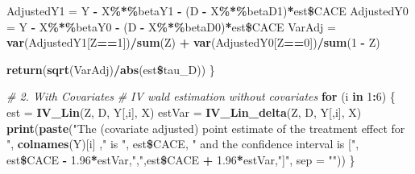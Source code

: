 \documentclass[]{article}
\newenvironment{Shaded}{\begin{snugshade}}{\end{snugshade}}
\newcommand{\KeywordTok}[1]{\textcolor[rgb]{0.13,0.29,0.53}{\textbf{#1}}}
\newcommand{\DataTypeTok}[1]{\textcolor[rgb]{0.13,0.29,0.53}{#1}}
\newcommand{\DecValTok}[1]{\textcolor[rgb]{0.00,0.00,0.81}{#1}}
\newcommand{\FloatTok}[1]{\textcolor[rgb]{0.00,0.00,0.81}{#1}}
\newcommand{\StringTok}[1]{\textcolor[rgb]{0.31,0.60,0.02}{#1}}
\newcommand{\CommentTok}[1]{\textcolor[rgb]{0.56,0.35,0.01}{\textit{#1}}}
\newcommand{\ControlFlowTok}[1]{\textcolor[rgb]{0.13,0.29,0.53}{\textbf{#1}}}
\newcommand{\OperatorTok}[1]{\textcolor[rgb]{0.81,0.36,0.00}{\textbf{#1}}}
\newcommand{\NormalTok}[1]{#1}
\begin{document}
\begin{Shaded}
\begin{Highlighting}[]
\NormalTok{  AdjustedY1   =}\StringTok{ }\NormalTok{Y }\OperatorTok{-}\StringTok{ }\NormalTok{X}\OperatorTok{\%*\%}\NormalTok{betaY1 }\OperatorTok{-}\StringTok{ }
\StringTok{                     }\NormalTok{(D }\OperatorTok{-}\StringTok{ }\NormalTok{X}\OperatorTok{\%*\%}\NormalTok{betaD1)}\OperatorTok{*}\NormalTok{est}\OperatorTok{\$}\NormalTok{CACE}
\NormalTok{  AdjustedY0   =}\StringTok{ }\NormalTok{Y }\OperatorTok{-}\StringTok{ }\NormalTok{X}\OperatorTok{\%*\%}\NormalTok{betaY0 }\OperatorTok{-}\StringTok{ }
\StringTok{                     }\NormalTok{(D }\OperatorTok{-}\StringTok{ }\NormalTok{X}\OperatorTok{\%*\%}\NormalTok{betaD0)}\OperatorTok{*}\NormalTok{est}\OperatorTok{\$}\NormalTok{CACE}
\NormalTok{  VarAdj       =}\StringTok{ }\KeywordTok{var}\NormalTok{(AdjustedY1[Z}\OperatorTok{==}\DecValTok{1}\NormalTok{])}\OperatorTok{/}\KeywordTok{sum}\NormalTok{(Z) }\OperatorTok{+}\StringTok{ }
\StringTok{                     }\KeywordTok{var}\NormalTok{(AdjustedY0[Z}\OperatorTok{==}\DecValTok{0}\NormalTok{])}\OperatorTok{/}\KeywordTok{sum}\NormalTok{(}\DecValTok{1} \OperatorTok{-}\StringTok{ }\NormalTok{Z)}
  
  \KeywordTok{return}\NormalTok{(}\KeywordTok{sqrt}\NormalTok{(VarAdj)}\OperatorTok{/}\KeywordTok{abs}\NormalTok{(est}\OperatorTok{\$}\NormalTok{tau_D))}
\NormalTok{\}}
\end{Highlighting}
\end{Shaded}

\begin{Shaded}
\begin{Highlighting}[]
\CommentTok{# 2. With Covariates}
\CommentTok{# IV wald estimation without covariates}
\ControlFlowTok{for}\NormalTok{ (i }\ControlFlowTok{in} \DecValTok{1}\OperatorTok{:}\DecValTok{6}\NormalTok{)}
\NormalTok{\{}
\NormalTok{  est =}\StringTok{ }\KeywordTok{IV_Lin}\NormalTok{(Z, D, Y[,i], X)}
\NormalTok{  estVar =}\StringTok{ }\KeywordTok{IV_Lin_delta}\NormalTok{(Z, D, Y[,i], X)}
  \KeywordTok{print}\NormalTok{(}\KeywordTok{paste}\NormalTok{(}\StringTok{"The (covariate adjusted) point estimate of the treatment effect for "}\NormalTok{, }\KeywordTok{colnames}\NormalTok{(Y)[i] ,}\StringTok{" is "}\NormalTok{, est}\OperatorTok{\$}\NormalTok{CACE, }\StringTok{" and the confidence interval is ["}\NormalTok{, est}\OperatorTok{\$}\NormalTok{CACE }\OperatorTok{-}\StringTok{ }\FloatTok{1.96}\OperatorTok{*}\NormalTok{estVar,}\StringTok{","}\NormalTok{,est}\OperatorTok{\$}\NormalTok{CACE }\OperatorTok{+}\StringTok{ }\FloatTok{1.96}\OperatorTok{*}\NormalTok{estVar,}\StringTok{"]"}\NormalTok{, }\DataTypeTok{sep =} \StringTok{""}\NormalTok{))}
\NormalTok{\}}
\end{Highlighting}
\end{Shaded}
\end{document}
